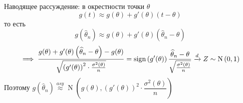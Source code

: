 \renewcommand{\thletter}{дельта-метод}
Наводящее рассуждение: в окрестности точки $\theta$
    \[g(t) \approx g(\theta) + g'(\theta)(t - \theta)\]
    то есть
    \[g\left(\widehat{\theta}_n\right) \approx g(\theta) + g'(\theta)\left(\widehat{\theta}_n - \theta\right)\]
    \[\implies\frac{g(\theta) + g'(\theta)\left(\widehat{\theta}_n - \theta\right) - g(\theta)}{\sqrt{\left(g'(\theta)\right)^2 \cdot \frac{\sigma^2(\theta)}{n}}} = \operatorname{sign}\left(g'(\theta)\right)\frac{\widehat{\theta}_n - \theta}{\sqrt{\frac{\sigma^2(\theta)}{n}}} \xrightarrow[]{d} Z \sim \operatorname{N}\,(0, 1)\]
    Поэтому $g\left(\widehat{\theta}_n\right) \overset{asy}{\approx} \operatorname{N}\left(g(\theta), \left(g'(\theta)\right)^2 \cdot \dfrac{\sigma^2(\theta)}{n}\right)$

